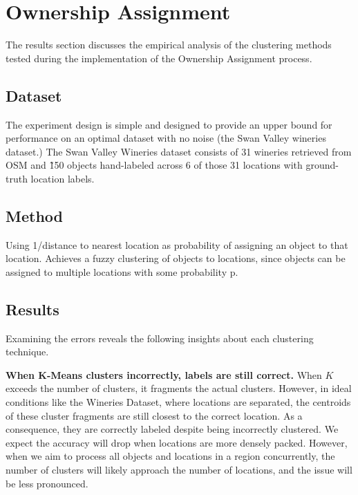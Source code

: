 \section{Ownership Assignment}
\label{section:ownership}

The results section discusses the empirical analysis of the clustering methods tested during the implementation of the Ownership Assignment process. 

\subsection{Dataset}
The experiment design is simple and designed to provide an upper bound for performance on an optimal dataset with no noise (the Swan Valley wineries dataset.) 
The Swan Valley Wineries dataset consists of 31 wineries retrieved from OSM and \~150 objects hand-labeled across 6 of those 31 locations with ground-truth location labels.


\subsection{Method}
Using 1/distance to nearest location as probability of assigning an object to that location.
Achieves a fuzzy clustering of objects to locations, since objects can be assigned to multiple locations with some probability p.


\subsection{Results}
Examining the errors reveals the following insights about each clustering technique. 

\textbf{When K-Means clusters incorrectly, labels are still correct.} When $K$ exceeds the number of clusters, it fragments the actual clusters. 
However, in ideal conditions like the Wineries Dataset, where locations are separated, the centroids of these cluster fragments are still closest to the correct location. 
As a consequence, they are correctly labeled despite being incorrectly clustered. We expect the accuracy will drop when locations are more densely packed. However, when we aim to process all objects and locations in a region concurrently, the number of clusters will likely approach the number of locations, and the issue will be less pronounced. 


